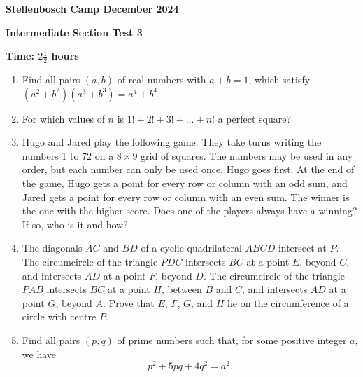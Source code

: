 \documentclass[12pt]{article}
\begin{document}
\begin{center} \large
    \textbf{Stellenbosch Camp December 2024}
    
    \textbf{Intermediate Section Test 3}
    
    \textbf{Time: \(2 \frac{1}{2}\) hours}
\end{center}

\begin{enumerate}[topsep=2\bigskipamount,itemsep=\bigskipamount]
\item Find all pairs $(a,b)$ of real numbers with $a+b = 1$, which satisfy $(a^2+b^2)(a^3+b^3)=a^4+b^4$.
\item For which values of $n$ is $1! + 2! + 3! + \dots + n!$ a perfect square?
\item Hugo and Jared play the following game. They take turns writing the numbers 1 to 72 on a $8\times 9$ grid of squares. The numbers may be used in any order, but each number can only be used once. Hugo goes first. At the end of the game, Hugo gets a point for every row or column with an odd sum, and Jared gets a point for every row or column with an even sum. The winner is the one with the higher score. Does one of the players always have a winning? If so, who is it and how? 
\item The diagonals $AC$ and $BD$ of a cyclic quadrilateral $ABCD$ intersect at $P$. The circumcircle of the triangle $PDC$ intersects $BC$ at a point $E$, beyond $C$, and intersects $AD$ at a point $F$, beyond $D$. The circumcircle of the triangle $PAB$ intersects $BC$ at a point $H$, between $B$ and $C$, and intersects $AD$ at a point $G$, beyond $A$. Prove that $E$, $F$, $G$, and $H$ lie on the circumference of a circle with centre $P$.
\item Find all pairs \((p, q)\) of prime numbers such that, for some positive integer \(a\), we have
\[p^{2} + 5pq + 4q^{2} = a^{2}.\]
\end{enumerate}
\end{document}
